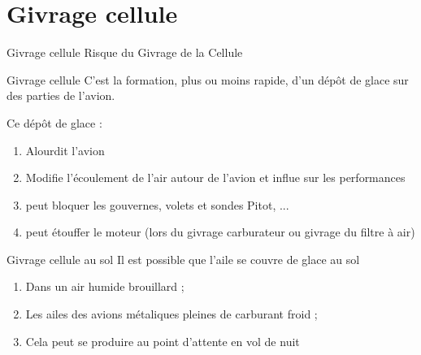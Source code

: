 \documentclass{beamer}
\begin{document}
\section{Givrage cellule}
\begin{frame}{Givrage cellule}
  \LARGE{Risque du Givrage de la Cellule}
\end{frame}

\begin{frame}{Givrage cellule}
  C'est la formation, plus ou moins rapide, d'un dépôt de glace sur des parties de l'avion.

  \pause
  Ce dépôt de glace :   \pause

  \begin{enumerate}
    \item Alourdit l'avion \pause
    \item Modifie l'écoulement de l'air autour de l'avion et influe sur les performances \pause
    \item peut bloquer les gouvernes, volets et sondes Pitot, ... \pause
    \item peut étouffer le moteur (lors du givrage carburateur ou givrage du filtre à air)
  \end{enumerate}
\end{frame}

\begin{frame}{Givrage cellule au sol}
  Il est possible que l'aile se couvre de glace au sol
  \pause
  \begin{enumerate}
    \item Dans un air humide brouillard ; \pause
    \item Les ailes des avions métaliques pleines de carburant froid ; \pause
    \item Cela peut se produire au point d'attente en vol de nuit
  \end{enumerate}
\end{frame}
\end{document}
